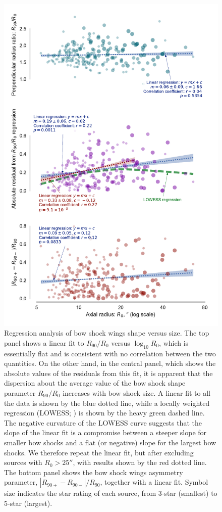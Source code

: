 \begin{figure}
  \centering
  \includegraphics[width=\linewidth]{figs/mipsgal-R90-ratio-versus-R0-heteroscedastic}
  \caption{Regression analysis of bow shock wings shape versus size.
    The top panel shows a linear fit to \(R_{90}/R_0\) versus
    \(\log_{10} R_0\), which is essentially flat and is consistent
    with no correlation between the two quantities.  On the other
    hand, in the central panel, which shows the absolute values of the
    residuals from this fit, it is apparent that the dispersion about
    the average value of the bow shock shape parameter \(R_{90}/R_0\)
    increases with bow shock size.  A linear fit to all the data is
    shown by the blue dotted line, while a locally weighted regression
    (LOWESS; \citealp{Cleveland:1979a, Cleveland:1988a}) is shown by
    the heavy green dashed line.  The negative curvature of the LOWESS
    curve suggests that the slope of the linear fit is a compromise
    between a steeper slope for smaller bow shocks and a flat (or
    negative) slope for the largest bow shocks.  We therefore repeat
    the linear fit, but after excluding sources with \(R_0 > 25''\),
    with results shown by the red dotted line.  The bottom panel shows
    the bow shock wings asymmetry parameter,
    \(|R_{90+} - R_{90-}| / R_{90}\), together with a linear fit.
    Symbol size indicates the star rating of each source, from 3-star
    (smallest) to 5-star (largest).}
  \label{fig:mipsgal-heteroscedastic}
\end{figure}

